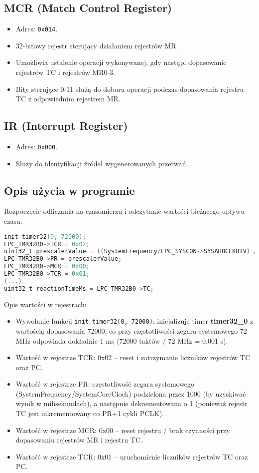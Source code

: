 \documentclass[letterpaper,11pt]{report}
\begin{document}
\subsection{MCR (Match Control Register)}
\begin{itemize}
    \item Adres: \texttt{0x014}.
    \item 32-bitowy rejestr sterujący działaniem rejestrów MR.
    \item Umożliwia ustalenie operacji wykonywanej, gdy nastąpi dopasowanie rejestrów TC i rejestrów MR0-3.
    \item Bity sterujące 0-11 służą do doboru operacji podczas dopasowania rejestru TC z odpowiednim rejestrem MR.
\end{itemize}

\subsection{IR (Interrupt Register)}
\begin{itemize}
    \item Adres: \texttt{0x000}.
    \item Służy do identyfikacji źródeł wygenerowanych przerwań.
\end{itemize}

\subsection{Opis użycia w programie}
Rozpoczęcie odliczania na czasomierzu i odczytanie wartości bieżącego upływu czasu:
\begin{lstlisting}[language=C]
init_timer32(0, 72000);
LPC_TMR32B0->TCR = 0x02;
uint32_t prescalerValue = ((SystemFrequency/LPC_SYSCON->SYSAHBCLKDIV) / 1000) - 1;
LPC_TMR32B0->PR = prescalerValue;
LPC_TMR32B0->MCR = 0x00;
LPC_TMR32B0->TCR = 0x01;
(...)
uint32_t reactionTimeMs = LPC_TMR32B0->TC;
\end{lstlisting}

Opis wartości w rejestrach:
\begin{itemize}
    \item Wywołanie funkcji \texttt{init\_timer32(0, 72000)}: inicjalizuje timer \textbf{timer32\_0} z wartością dopasowania 72000, co przy częstotliwości zegara systemowego 72 MHz odpowiada dokładnie 1 ms (72000 taktów / 72 MHz = 0{,}001 s).
    \item Wartość w rejestrze TCR: 0x02 – reset i zatrzymanie liczników rejestrów TC oraz PC.
    \item Wartość w rejestrze PR: częstotliwość zegara systemowego (SystemFrequency/SystemCoreClock) podzielona przez 1000 (by uzyskiwać wynik w milisekundach), a następnie dekrementowana o 1 (ponieważ rejestr TC jest inkrementowany co PR+1 cykli PCLK).
    \item Wartość w rejestrze MCR: 0x00 – reset rejestru / brak czynności przy dopasowaniu rejestrów MR i rejestru TC.
    \item Wartość w rejestrze TCR: 0x01 – uruchomienie liczników rejestrów TC oraz PC.
\end{itemize}
\vspace{15pt}
\end{document}
